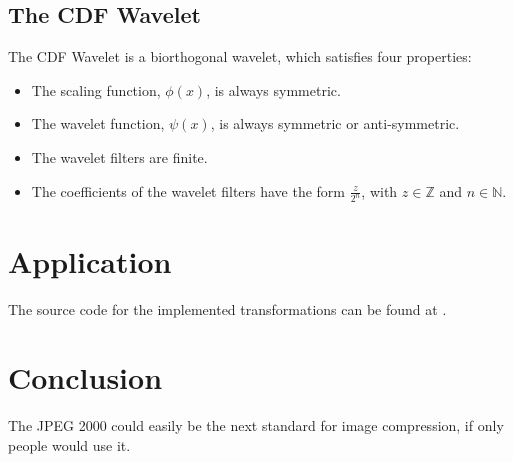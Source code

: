 \documentclass{article}
\begin{document}
\subsection{The CDF Wavelet}

The CDF Wavelet is a biorthogonal wavelet, which satisfies four properties\cite{old}:
\begin{itemize}
	\item The scaling function, $\phi(x)$, is always symmetric.
	\item The wavelet function, $\psi(x)$, is always symmetric or anti-symmetric.
	\item The wavelet filters are finite.
	\item The coefficients of the wavelet filters have the form $\frac{z}{2^n}$, with $z\in\mathbb{Z}$ and $n\in\mathbb{N}$.
\end{itemize}



\section{Application}

The source code for the implemented transformations can be found at \cite{wlrepo}.


\section{Conclusion}

The JPEG 2000 could easily be the next standard for image compression, if only people would use it.


\printbibliography[]
\end{document}
